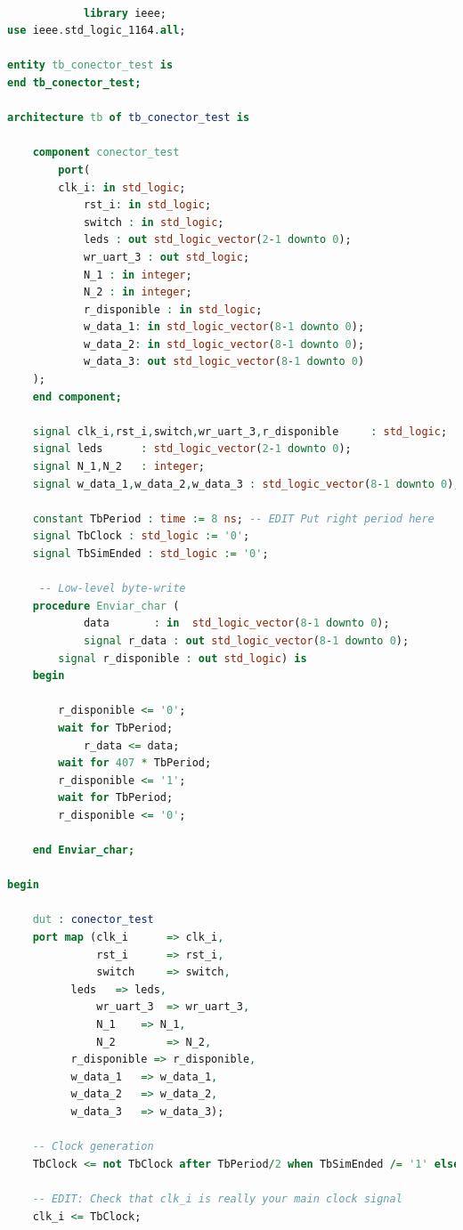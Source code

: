 			
		\begin{lstlisting}[language = vhdl,caption=Testbench del módulo selector,label={lst:test_selector}] 
				
			library ieee;
use ieee.std_logic_1164.all;

entity tb_conector_test is
end tb_conector_test;

architecture tb of tb_conector_test is

    component conector_test
        port(
		clk_i: in std_logic;
        	rst_i: in std_logic;
        	switch : in std_logic;
        	leds : out std_logic_vector(2-1 downto 0);
        	wr_uart_3 : out std_logic;
       	 	N_1 : in integer;
       	 	N_2 : in integer;
        	r_disponible : in std_logic;
        	w_data_1: in std_logic_vector(8-1 downto 0);
        	w_data_2: in std_logic_vector(8-1 downto 0);
        	w_data_3: out std_logic_vector(8-1 downto 0)
	);
    end component;

    signal clk_i,rst_i,switch,wr_uart_3,r_disponible     : std_logic;
    signal leds      : std_logic_vector(2-1 downto 0);
    signal N_1,N_2   : integer;
    signal w_data_1,w_data_2,w_data_3 : std_logic_vector(8-1 downto 0);

    constant TbPeriod : time := 8 ns; -- EDIT Put right period here
    signal TbClock : std_logic := '0';
    signal TbSimEnded : std_logic := '0';

	 -- Low-level byte-write
  	procedure Enviar_char (
    		data       : in  std_logic_vector(8-1 downto 0);
    		signal r_data : out std_logic_vector(8-1 downto 0);
		signal r_disponible : out std_logic) is
  	begin
		
		r_disponible <= '0';
		wait for TbPeriod;
        	r_data <= data;
		wait for 407 * TbPeriod;
		r_disponible <= '1';
		wait for TbPeriod;
		r_disponible <= '0';

  	end Enviar_char;

begin

    dut : conector_test
    port map (clk_i      => clk_i,
              rst_i      => rst_i,
              switch     => switch,
	      leds 	 => leds,
              wr_uart_3  => wr_uart_3,
              N_1  	 => N_1,
              N_2    	 => N_2,
	      r_disponible => r_disponible,
	      w_data_1   => w_data_1,
	      w_data_2   => w_data_2,
	      w_data_3   => w_data_3);
 
    -- Clock generation
    TbClock <= not TbClock after TbPeriod/2 when TbSimEnded /= '1' else '0';

    -- EDIT: Check that clk_i is really your main clock signal
    clk_i <= TbClock;


\end{lstlisting}

